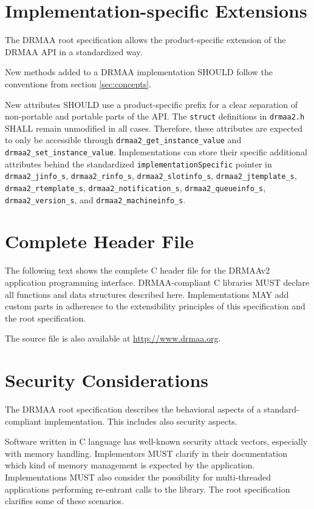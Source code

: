 \documentclass{article}
\newcommand{\h}[1]{\texttt{#1}}
\begin{document}
\section{Implementation-specific Extensions}
\label{sec:implspec}

The DRMAA root specification allows the product-specific extension of the DRMAA API in a standardized way.

New methods added to a DRMAA implementation SHOULD follow the conventions from section \ref{sec:concepts}.

New attributes SHOULD use a product-specific prefix for a clear separation of non-portable and portable parts of the API. The \h{struct} definitions in \h{drmaa2.h} SHALL remain unmodified in all cases. Therefore, these attributes are expected to only be accessible through \h{drmaa2\_get\_instance\_value} and \h{drmaa2\_set\_instance\_value}. Implementations can store their specific additional attributes behind the standardized \h{implementationSpecific} pointer in \h{drmaa2\_jinfo\_s}, \h{drmaa2\_rinfo\_s}, \h{drmaa2\_slotinfo\_s}, \h{drmaa2\_jtemplate\_s}, \h{drmaa2\_rtemplate\_s}, \h{drmaa2\_notification\_s}, \h{drmaa2\_queueinfo\_s}, \h{drmaa2\_version\_s}, and \h{drmaa2\_machineinfo\_s}.

\section{Complete Header File}
\label{sec:idl}

The following text shows the complete C header file for the DRMAAv2 application programming interface. DRMAA-compliant C libraries MUST declare all functions and data structures described here. Implementations MAY add custom parts in adherence to the extensibility principles of this specification and the root specification.

The source file is also available at \url{http://www.drmaa.org}.



\section{Security Considerations}
\label{sec:security}

The DRMAA root specification \cite{gfd194}  describes the behavioral aspects of a standard-compliant implementation. This includes also security aspects.

Software written in C language has well-known security attack vectors, especially with memory handling. Implementors MUST clarify in their documentation which kind of memory management is expected by the application. Implementations MUST also consider the possibility for multi-threaded applications performing re-entrant calls to the library. The root specification clarifies some of these scenarios.
\end{document}
